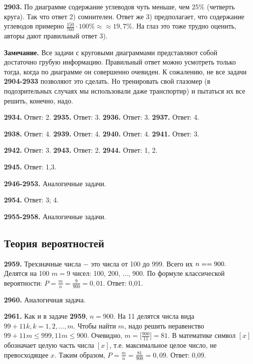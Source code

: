 \textbf{2903.} По диаграмме содержание углеводов чуть меньше, чем $25\%$ (четверть круга). Так что ответ 2) сомнителен. Ответ же 3) предполагает, что содержание углеводов примерно $\frac{150}{760}\cdot100\%\approx$\newline$\approx19,7\%$. На глаз это тоже трудно оценить, авторы дают правильный ответ 3).

\textbf{Замечание.} Все задачи с круговыми диаграммами представляют собой достаточно грубую информацию. Правильный ответ можно усмотреть только тогда, когда по диаграмме он совершенно очевиден. К сожалению, не все задачи \textbf{2904-2933} позволяют это сделать. Но тренировать свой глазомер (в подозрительных случаях мы использовали даже транспортир) и пытаться их все решить, конечно, надо.

\textbf{2934.} Ответ: 2. \textbf{2935.} Ответ: 3. \textbf{2936.} Ответ: 3. \textbf{2937.} Ответ: 4.

\textbf{2938.} Ответ: 4. \textbf{2939.} Ответ: 4. \textbf{2940.} Ответ: 4. \textbf{2941.} Ответ: 3.

 \textbf{2942.} Ответ: 3. \textbf{2943.} Ответ: 2. \textbf{2944.} Ответ: 1, 2.

\textbf{2945.} Ответ: 1,3. 

\textbf{2946-2953.} Аналогичные задачи.

\textbf{2954.} Ответ: 3; 4.

\textbf{2955-2958.} Аналогичные задачи.

\subsection{Теория вероятностей}

\textbf{2959.} Трехзначные числа $-$ это числа от 100 до 999. Всего их $n=\linebreak=900.$ Делятся на 100 $m=9$ чисел: 100, 200, ..., 900. По формуле классической вероятности: $P=\frac{m}{n}=\frac{9}{900}=0,01.$ \newline \null \hspace*{\fill} Ответ: 0,01. 

\textbf{2960.} Аналогичная задача.

\textbf{2961.} Как и в задаче \textbf{2959}, $n=900$. На 11 делятся числа вида $99+11k, k=1, 2, \dots, m.$ Чтобы найти $m$, надо решить неравенство $99+11m\leq999, 11m\leq900.$ Очевидно, $m=\bigg[\frac{900}{11}\bigg]=81.$ В математике символ $[x]$ обозначает целую часть числа $[x]$, т.е. максимальное целое число, не превосходящее $x$. Таким образом, $P = \frac{m}{n}=\frac{81}{900}=0,09.$ \newline \null \hspace*{\fill} Ответ: 0,09. 

